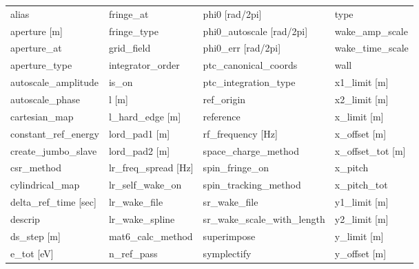  \begin{tabular}{llll} \toprule
alias                          & fringe_at                      & phi0 [rad/2pi]                 & type                           \\
aperture [m]                   & fringe_type                    & phi0_autoscale [rad/2pi]       & wake_amp_scale                 \\
aperture_at                    & grid_field                     & phi0_err [rad/2pi]             & wake_time_scale                \\
aperture_type                  & integrator_order               & ptc_canonical_coords           & wall                           \\
autoscale_amplitude            & is_on                          & ptc_integration_type           & x1_limit [m]                   \\
autoscale_phase                & l [m]                          & ref_origin                     & x2_limit [m]                   \\
cartesian_map                  & l_hard_edge [m]                & reference                      & x_limit [m]                    \\
constant_ref_energy            & lord_pad1 [m]                  & rf_frequency [Hz]              & x_offset [m]                   \\
create_jumbo_slave             & lord_pad2 [m]                  & space_charge_method            & x_offset_tot [m]               \\
csr_method                     & lr_freq_spread [Hz]            & spin_fringe_on                 & x_pitch                        \\
cylindrical_map                & lr_self_wake_on                & spin_tracking_method           & x_pitch_tot                    \\
delta_ref_time [sec]           & lr_wake_file                   & sr_wake_file                   & y1_limit [m]                   \\
descrip                        & lr_wake_spline                 & sr_wake_scale_with_length      & y2_limit [m]                   \\
ds_step [m]                    & mat6_calc_method               & superimpose                    & y_limit [m]                    \\
e_tot [eV]                     & n_ref_pass                     & symplectify                    & y_offset [m]                   \\

\end{tabular}
